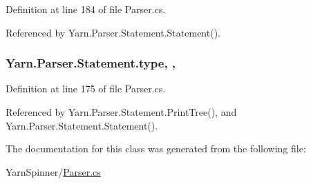 Definition at line 184 of file Parser.\-cs.



Referenced by Yarn.\-Parser.\-Statement.\-Statement().

\hypertarget{a00160_aa3fa0eb260e412720562ce06b7dc06fe}{
\subsubsection[{type}]{ Yarn.\-Parser.\-Statement.\-type\hspace{0.3cm}{\ttfamily [get]}, {\ttfamily [set]}, {\ttfamily [package]}}}\label{a00160_aa3fa0eb260e412720562ce06b7dc06fe}


Definition at line 175 of file Parser.\-cs.



Referenced by Yarn.\-Parser.\-Statement.\-Print\-Tree(), and Yarn.\-Parser.\-Statement.\-Statement().



The documentation for this class was generated from the following file\-:\begin{DoxyCompactItemize}
\item 
Yarn\-Spinner/\hyperlink{a00301}{Parser.\-cs}\end{DoxyCompactItemize}
